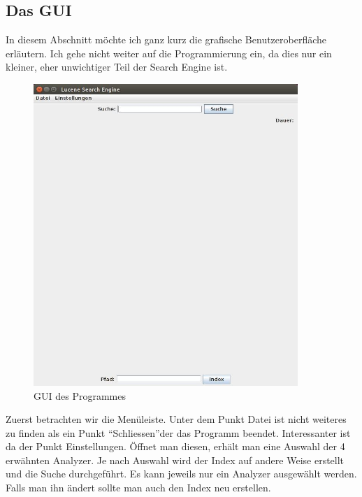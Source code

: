 \documentclass[12pt,a4paper,ngerman]{report}
\begin{document}
\subsection{Das GUI}
In diesem Abschnitt möchte ich ganz kurz die grafische Benutzeroberfläche erläutern. Ich gehe nicht weiter auf die Programmierung ein, da dies nur ein kleiner, eher unwichtiger Teil der Search Engine ist.
\begin{figure}[h!]
\centering
\includegraphics[width=10cm]{img/Lucene_Search_Engine_1.jpg}
\caption{GUI des Programmes\protect\footnotemark}
\end{figure}
Zuerst betrachten wir die Menüleiste. Unter dem Punkt Datei ist nicht weiteres zu finden als ein Punkt \textquotedblleft Schliessen\textquotedblright der das Programm beendet. Interessanter ist da der Punkt Einstellungen. Öffnet man diesen, erhält man eine Auswahl der 4 erwähnten Analyzer. Je nach Auswahl wird der Index auf andere Weise erstellt und die Suche durchgeführt. Es kann jeweils nur ein Analyzer ausgewählt werden. Falls man ihn ändert sollte man auch den Index neu erstellen.
\end{document}
